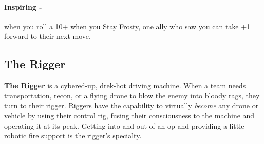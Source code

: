 \paragraph{Inspiring -} when you roll a 10+ when you Stay Frosty, one ally who saw you can take +1 forward to their next move.




\clearpage
\subsection{The Rigger}
\textbf{The Rigger} is a cybered-up, drek-hot driving machine. When a team needs transportation, recon, or a flying drone to blow the enemy into bloody rags, they turn to their rigger. Riggers have the capability to virtually \textit{become} any drone or vehicle by using their control rig, fusing their consciousness to the machine and operating it at its peak. Getting into and out of an op and providing a little robotic fire support is the rigger’s specialty.

